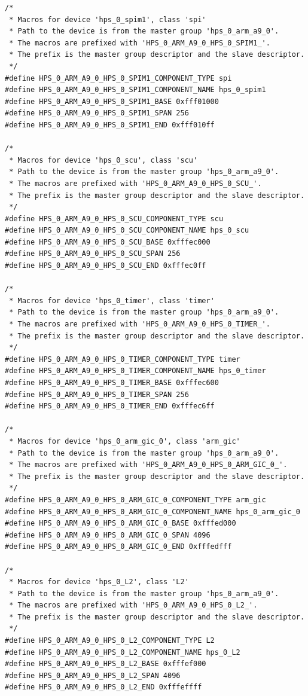 \documentclass[conference]{IEEEtran}
\begin{document}
\begin{lstlisting}
/*
 * Macros for device 'hps_0_spim1', class 'spi'
 * Path to the device is from the master group 'hps_0_arm_a9_0'.
 * The macros are prefixed with 'HPS_0_ARM_A9_0_HPS_0_SPIM1_'.
 * The prefix is the master group descriptor and the slave descriptor.
 */
#define HPS_0_ARM_A9_0_HPS_0_SPIM1_COMPONENT_TYPE spi
#define HPS_0_ARM_A9_0_HPS_0_SPIM1_COMPONENT_NAME hps_0_spim1
#define HPS_0_ARM_A9_0_HPS_0_SPIM1_BASE 0xfff01000
#define HPS_0_ARM_A9_0_HPS_0_SPIM1_SPAN 256
#define HPS_0_ARM_A9_0_HPS_0_SPIM1_END 0xfff010ff

/*
 * Macros for device 'hps_0_scu', class 'scu'
 * Path to the device is from the master group 'hps_0_arm_a9_0'.
 * The macros are prefixed with 'HPS_0_ARM_A9_0_HPS_0_SCU_'.
 * The prefix is the master group descriptor and the slave descriptor.
 */
#define HPS_0_ARM_A9_0_HPS_0_SCU_COMPONENT_TYPE scu
#define HPS_0_ARM_A9_0_HPS_0_SCU_COMPONENT_NAME hps_0_scu
#define HPS_0_ARM_A9_0_HPS_0_SCU_BASE 0xfffec000
#define HPS_0_ARM_A9_0_HPS_0_SCU_SPAN 256
#define HPS_0_ARM_A9_0_HPS_0_SCU_END 0xfffec0ff

/*
 * Macros for device 'hps_0_timer', class 'timer'
 * Path to the device is from the master group 'hps_0_arm_a9_0'.
 * The macros are prefixed with 'HPS_0_ARM_A9_0_HPS_0_TIMER_'.
 * The prefix is the master group descriptor and the slave descriptor.
 */
#define HPS_0_ARM_A9_0_HPS_0_TIMER_COMPONENT_TYPE timer
#define HPS_0_ARM_A9_0_HPS_0_TIMER_COMPONENT_NAME hps_0_timer
#define HPS_0_ARM_A9_0_HPS_0_TIMER_BASE 0xfffec600
#define HPS_0_ARM_A9_0_HPS_0_TIMER_SPAN 256
#define HPS_0_ARM_A9_0_HPS_0_TIMER_END 0xfffec6ff

/*
 * Macros for device 'hps_0_arm_gic_0', class 'arm_gic'
 * Path to the device is from the master group 'hps_0_arm_a9_0'.
 * The macros are prefixed with 'HPS_0_ARM_A9_0_HPS_0_ARM_GIC_0_'.
 * The prefix is the master group descriptor and the slave descriptor.
 */
#define HPS_0_ARM_A9_0_HPS_0_ARM_GIC_0_COMPONENT_TYPE arm_gic
#define HPS_0_ARM_A9_0_HPS_0_ARM_GIC_0_COMPONENT_NAME hps_0_arm_gic_0
#define HPS_0_ARM_A9_0_HPS_0_ARM_GIC_0_BASE 0xfffed000
#define HPS_0_ARM_A9_0_HPS_0_ARM_GIC_0_SPAN 4096
#define HPS_0_ARM_A9_0_HPS_0_ARM_GIC_0_END 0xfffedfff

/*
 * Macros for device 'hps_0_L2', class 'L2'
 * Path to the device is from the master group 'hps_0_arm_a9_0'.
 * The macros are prefixed with 'HPS_0_ARM_A9_0_HPS_0_L2_'.
 * The prefix is the master group descriptor and the slave descriptor.
 */
#define HPS_0_ARM_A9_0_HPS_0_L2_COMPONENT_TYPE L2
#define HPS_0_ARM_A9_0_HPS_0_L2_COMPONENT_NAME hps_0_L2
#define HPS_0_ARM_A9_0_HPS_0_L2_BASE 0xfffef000
#define HPS_0_ARM_A9_0_HPS_0_L2_SPAN 4096
#define HPS_0_ARM_A9_0_HPS_0_L2_END 0xfffeffff


\end{lstlisting}
\end{document}
